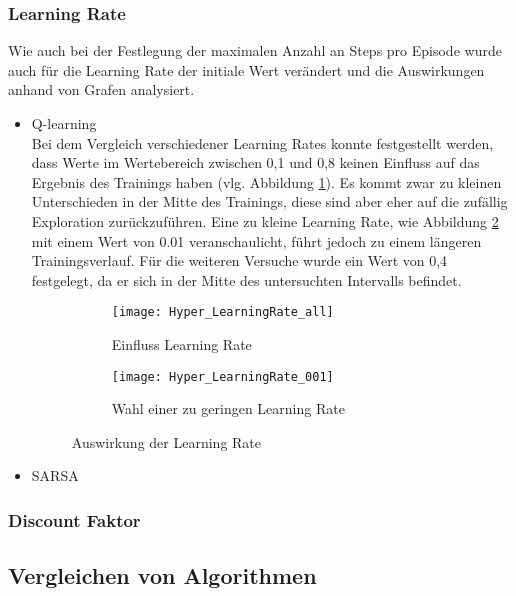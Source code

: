 \subsubsection{Learning Rate}
Wie auch bei der Festlegung der maximalen Anzahl an Steps pro Episode wurde auch für die Learning Rate der initiale Wert verändert und die Auswirkungen anhand von Grafen analysiert.
\begin{itemize}
    \item Q-learning\\
    Bei dem Vergleich verschiedener Learning Rates konnte festgestellt werden, dass Werte im Wertebereich zwischen 0,1 und 0,8 keinen Einfluss auf das Ergebnis des Trainings haben (vlg. Abbildung \ref{fig:learningRate_all}).
    Es kommt zwar zu kleinen Unterschieden in der Mitte des Trainings, diese sind aber eher auf die zufällig Exploration zurückzuführen.
    Eine zu kleine Learning Rate, wie Abbildung \ref{fig:learningRate_low} mit einem Wert von 0.01 veranschaulicht, führt jedoch zu einem längeren Trainingsverlauf.
    Für die weiteren Versuche wurde ein Wert von 0,4 festgelegt, da er sich in der Mitte des untersuchten Intervalls befindet.

    \begin{figure}[H]
        \centering
        \begin{subfigure}{.5\textwidth}
          \centering
          \texttt{[image: Hyper\_LearningRate\_all]}
          \caption{Einfluss Learning Rate}
          \label{fig:learningRate_all}
        \end{subfigure}%
        \begin{subfigure}{.5\textwidth}
          \centering
          \texttt{[image: Hyper\_LearningRate\_001]}
          \caption{Wahl einer zu geringen Learning Rate}
          \label{fig:learningRate_low}
        \end{subfigure}
        \caption{Auswirkung der Learning Rate}
        \label{fig:learningRate_Q-Learning}
    \end{figure}
    \item SARSA
\end{itemize}
\subsubsection{Discount Faktor}


\subsection{Vergleichen von Algorithmen}

